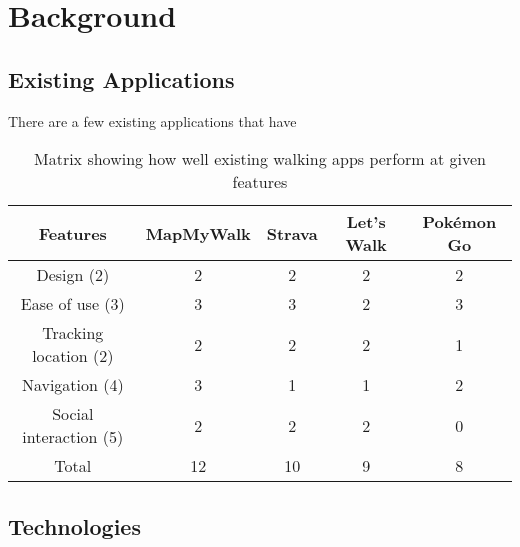 \chapter{Background}



\section{Existing Applications}

There are a few existing applications that have 

\begin{table}[h]
  \centering
  \begin{tabular}{|c||c|c|c|c|}
    \hline
    Features & MapMyWalk & Strava & Let's Walk & Pokémon Go\\
    \hline
    \hline
    Design (2) & 2 & 2 & 2 & 2\\
    \hline
    Ease of use (3) & 3 & 3 & 2 & 3\\
    \hline
    Tracking location (2) & 2 & 2 & 2 & 1\\
    \hline
    Navigation (4) & 3 & 1 & 1 & 2\\
    \hline
    Social interaction (5) & 2 & 2 & 2 & 0\\
    \hline
    \hline
    Total & 12 & 10 & 9 & 8\\
    \hline
  \end{tabular}
  \caption{Matrix showing how well existing walking apps perform at given features}
  \label{table:existing-walking-apps}
\end{table}


%    


\section{Technologies}


